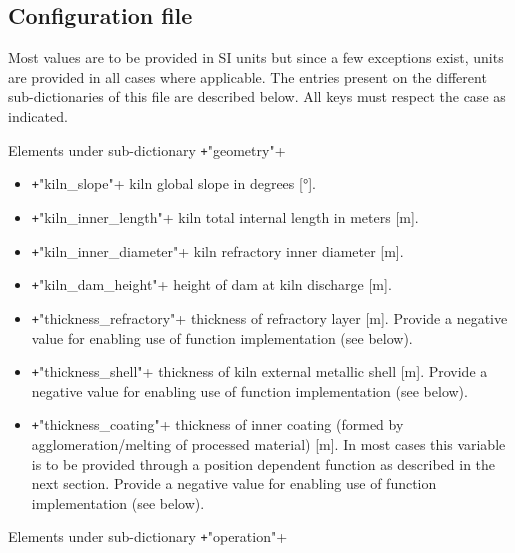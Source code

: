\documentclass[11pt]{paper}
\begin{document}
\subsection{Configuration file}

Most values are to be provided in SI units but since a few exceptions exist, units are provided in all cases where applicable. The entries present on the different sub-dictionaries of this file are described below. All keys must respect the case as indicated.

\noindent{}Elements under sub-dictionary \texttt+"geometry"+

\begin{itemize}
    \item \texttt+"kiln_slope"+
    kiln global slope in degrees [\si{\degree}].
    
    \item \texttt+"kiln_inner_length"+
    kiln total internal length in meters [\si{\meter}].
    
    \item \texttt+"kiln_inner_diameter"+
    kiln refractory inner diameter [\si{\meter}].
    
    \item \texttt+"kiln_dam_height"+
    height of dam at kiln discharge [\si{\meter}].
    
    \item \texttt+"thickness_refractory"+
    thickness of refractory layer [\si{\meter}]. Provide a negative value for enabling use of function implementation (see below).
    
    \item \texttt+"thickness_shell"+
    thickness of kiln external metallic shell [\si{\meter}]. Provide a negative value for enabling use of function implementation (see below).
    
    \item \texttt+"thickness_coating"+
    thickness of inner coating (formed by agglomeration/melting of processed material) [\si{\meter}]. In most cases this variable is to be provided through a position dependent function as described in the next section. Provide a negative value for enabling use of function implementation (see below).
\end{itemize}

\noindent{}Elements under sub-dictionary \texttt+"operation"+
\end{document}
